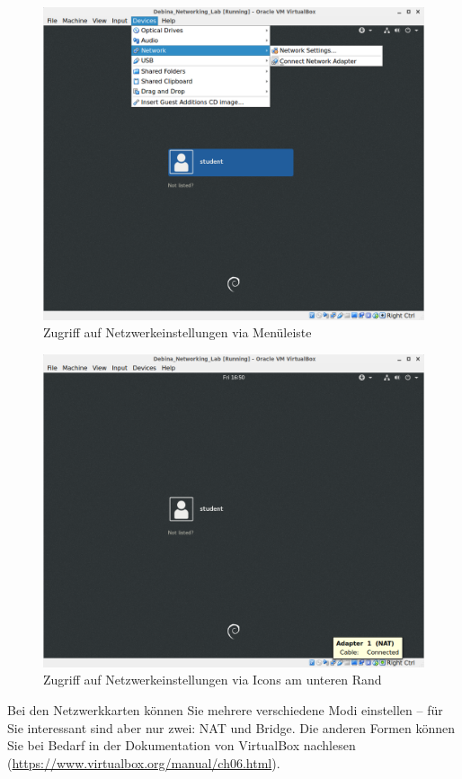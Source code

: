 \documentclass[paper=a4,fontsize=11pt]{scrartcl}%
\numberwithin{equation}{section}
\begin{document}
\begin{figure}[H]
\centering
\includegraphics[scale=0.4]{vbox3}
\caption{Zugriff auf Netzwerkeinstellungen via Menüleiste}
\label{vbox3}
\end{figure}
\begin{figure}[H]
\centering
\includegraphics[scale=0.4]{vbox4}
\caption{Zugriff auf Netzwerkeinstellungen via Icons am unteren Rand}
\label{vbox4}
\end{figure}
Bei den Netzwerkkarten können Sie mehrere verschiedene Modi einstellen -- für Sie interessant sind aber nur zwei: NAT und Bridge. Die anderen Formen können Sie bei Bedarf in der Dokumentation von VirtualBox nachlesen (\url{https://www.virtualbox.org/manual/ch06.html}).
\end{document}
